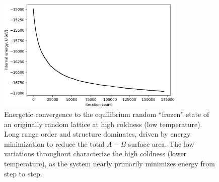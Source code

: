 \documentclass[10pt]{article}
\begin{document}
\begin{figure}[h!]
\centering
\includegraphics[width=0.80\textwidth]{Figures/verification_frozen_convergence.png}
\caption{Energetic convergence to the equilibrium random ``frozen'' state of an originally random lattice at high coldness (low temperature).
Long range order and structure dominates, driven by energy minimization to reduce the total $A-B$ surface area.
The low variations throughout characterize the high coldness (lower temperature), as the system nearly primarily minimizes energy from step to step.}
\label{fig:frozen_convergence}
\end{figure}


\clearpage

\end{document}
